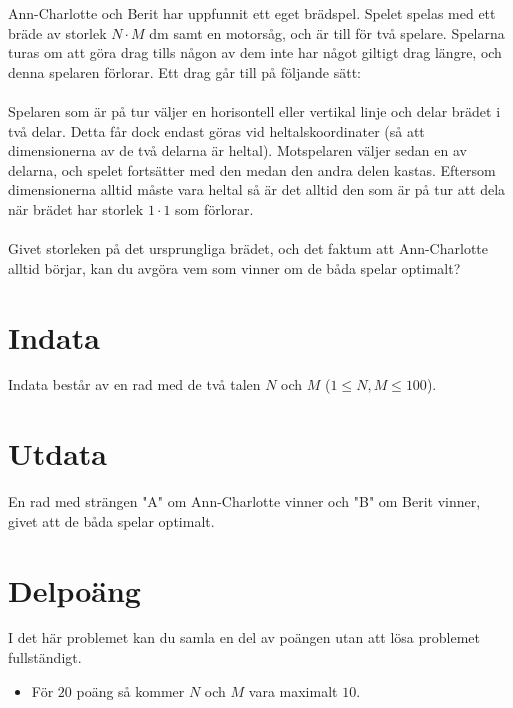 
Ann-Charlotte och Berit har uppfunnit ett eget brädspel. Spelet spelas med ett bräde av storlek $N\cdot{M}$ dm samt en motorsåg, och är till för två spelare. Spelarna turas om att göra drag tills någon av dem inte har något giltigt drag längre, och denna spelaren förlorar. Ett drag går till på följande sätt:
\\\\
Spelaren som är på tur väljer en horisontell eller vertikal linje och delar brädet i två delar. Detta får dock endast göras vid heltalskoordinater (så att dimensionerna av de två delarna är heltal). Motspelaren väljer sedan en av delarna, och spelet fortsätter med den medan den andra delen kastas. Eftersom dimensionerna alltid måste vara heltal så är det alltid den som är på tur att dela när brädet har storlek $1\cdot{1}$ som förlorar.
\\\\
Givet storleken på det ursprungliga brädet, och det faktum att Ann-Charlotte alltid börjar, kan du avgöra vem som vinner om de båda spelar optimalt?

\section*{Indata}
Indata består av en rad med de två talen $N$ och $M$ ($1 \le N,M \le 100$).

\section*{Utdata}

En rad med strängen "A" om Ann-Charlotte vinner och "B" om Berit vinner, givet att de båda spelar optimalt.

\section*{Delpoäng}

I det här problemet kan du samla en del av poängen utan att
lösa problemet fullständigt.

\begin{itemize}
    \item För $20$ poäng så kommer $N$ och $M$ vara maximalt $10$.
\end{itemize}
